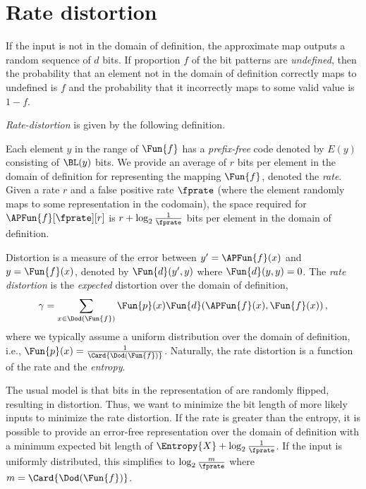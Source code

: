 \section{Rate distortion}
















If the input is not in the domain of definition, the approximate map outputs a random sequence of $d$ bits.
If proportion $f$ of the bit patterns are \emph{undefined}, then the probability that an element not in the domain of definition correctly maps to undefined is $f$ and the probability that it incorrectly maps to some valid value is $1-f$.



\emph{Rate-distortion} is given by the following definition.

Each element $y$ in the range of $\Fun{f}$ has a \emph{prefix-free} code denoted by $E(y)$ consisting of $\BL(y)$ bits.
We provide an average of $r$ bits per element in the domain of definition for representing the mapping $\Fun{f}$, denoted the \emph{rate}.
Given a rate $r$ and a false positive rate $\fprate$ (where the element randomly maps to some representation in the codomain), the space required for $\APFun{f}[\fprate][r]$ is $r + \log_2 \frac{1}{\fprate}$ bits per element in the domain of definition.

Distortion is a measure of the error between $y' = \APFun{f}(x)$ and $y = \Fun{f}(x)$, denoted by $\Fun{d}(y',y)$ where $\Fun{d}(y,y) = 0$.
The \emph{rate distortion} is the \emph{expected} distortion over the domain of definition,
\begin{equation}
\gamma = \sum_{x \in \Dod(\Fun{f})} \Fun{p}(x) \Fun{d}(\APFun{f}(x),\Fun{f}(x))\,,
\end{equation}
where we typically assume a uniform distribution over the domain of definition, i.e., $\Fun{p}(x) = \frac{1}{\Card{\Dod(\Fun{f})}}$.
Naturally, the rate distortion is a function of the rate and the \emph{entropy}.

The usual model is that bits in the representation of are randomly flipped, resulting in distortion.
Thus, we want to minimize the bit length of more likely inputs to minimize the rate distortion.
If the rate is greater than the entropy, it is possible to provide an error-free representation over the domain of definition with a minimum expected bit length of $\Entropy{X} + \log_2 \frac{1}{\fprate}$.
If the input is uniformly distributed, this simplifies to $\log_2 \frac{m}{\fprate}$ where $m = \Card{\Dod(\Fun{f})}$.


